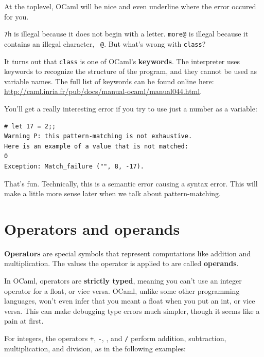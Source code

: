 \documentclass[10pt]{book}
\begin{document}
At the toplevel, OCaml will be nice and even underline 
where the error occured for you.

{\tt 7h} is illegal because it does not begin with a letter.
{\tt more@} is illegal because it contains an illegal character, {\tt
@}.  But what's wrong with {\tt class}?

It turns out that {\tt class} is one of OCaml's {\bf keywords}.  The
interpreter uses keywords to recognize the structure of the program,
and they cannot be used as variable names. The full list of keywords 
can be found online here: 
\url{http://caml.inria.fr/pub/docs/manual-ocaml/manual044.html}.


You'll get a really interesting error if you try to use just a 
number as a variable:

\beforeverb
\begin{verbatim}
# let 17 = 2;;
Warning P: this pattern-matching is not exhaustive.
Here is an example of a value that is not matched:
0
Exception: Match_failure ("", 8, -17).
\end{verbatim}
\afterverb

That's fun. Technically, this is a semantic error causing a 
syntax error. This will make a little more sense later when
we talk about pattern-matching.

\section{Operators and operands}

{\bf Operators} are special symbols that represent computations like
addition and multiplication.  The values the operator is applied to
are called {\bf operands}.


In OCaml, operators are {\bf strictly typed}, meaning you can't use an integer operator
for a float, or vice versa. OCaml, unlike some other programming languages, won't
even infer that you meant a float when you put an int, or vice versa. This can make
debugging type errors much simpler, though it seems like a pain at first.


For integers, the operators {\tt +}, {\tt -}, {\tt *}, and {\tt /}
perform addition, subtraction, multiplication, and division, as in 
the following examples:
\end{document}
